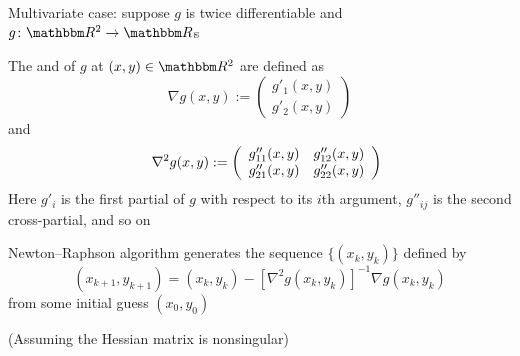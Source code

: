 \begin{frame}

    \vspace{2em}
    Multivariate case: suppose $g$ is
    twice differentiable and $g \colon \RR^2 \to \RR$s
    
    \vspace{.7em}
    The 
    and  of $g$ at $(x,y) \in \RR^2$ are defined as
    \begin{equation*}
         \nabla g(x,y) := 
        \left( 
        \begin{array}{c}
            g'_1 (x,y) \\
            g'_2 (x,y) 
        \end{array}
        \right)
    \end{equation*}
    and
    \begin{equation*}
         \\\quad
        \nabla^2 g(x,y) := 
        \left( 
        \begin{array}{cc}
            g''_{11} (x,y) 
            & g''_{12} (x,y) 
            \\
            g''_{21} (x,y) 
            & g''_{22} (x,y) 
        \end{array}
        \right)
    \end{equation*}
    Here $g'_i$ is the first partial of $g$ with respect to its $i$th argument,
    $g''_{ij}$ is the second cross-partial, and so on

\end{frame}

\begin{frame}

    \vspace{2em}
    Newton--Raphson algorithm generates the sequence $\{(x_k, y_k)\}$
    defined by
    \begin{equation*}
        \label{eq:2dnr}
        (x_{k+1}, y_{k+1}) = (x_k, y_k) 
            - [\nabla^2 g(x_k, y_k)]^{-1} \nabla g(x_k, y_k)
    \end{equation*}
    from some initial guess $(x_0, y_0)$
    
    (Assuming the
    Hessian matrix is nonsingular)
    
\end{frame}

